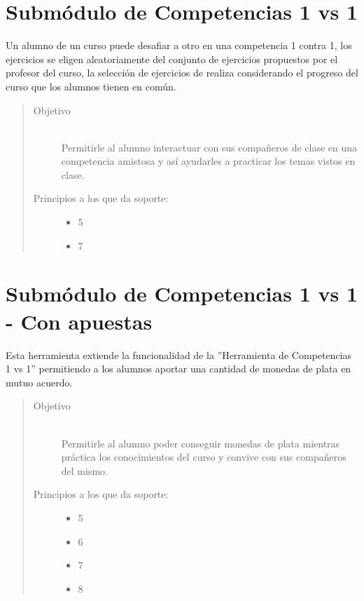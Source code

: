     
\section{Submódulo de Competencias 1 vs 1}

    Un alumno de un curso puede desafiar a otro en una competencia 1 contra 1, los ejercicios se eligen aleatoriamente del conjunto de ejercicios propuestos por el profesor del curso, la selección de ejercicios de realiza considerando el progreso del curso que los alumnos tienen en común.
    
    \begin{quote}
    \begin{description}
    \item[Objetivo] \hfill\\
        Permitirle al alumno interactuar con sus compañeros de clase en una competencia amistosa y así ayudarles a practicar los temas vistos en clase.
    
    \item[Principios a los que da soporte:] \hfill
        \begin{itemize}
            \item 5 \principioV
            \item 7 \principioVII 
        \end{itemize}
    \end{description}
    \end{quote}
 
\section{Submódulo de Competencias 1 vs 1 - Con apuestas}

    Esta herramienta extiende la funcionalidad de la ''Herramienta de Competencias 1 vs 1'' permitiendo a los alumnos aportar una cantidad de monedas de plata en mutuo acuerdo.
    
    \begin{quote}
    \begin{description}
    \item[Objetivo] \hfill\\
        Permitirle al alumno poder conseguir monedas de plata mientras práctica los conocimientos del curso y convive con sus compañeros del mismo.
    
    \item[Principios a los que da soporte:] \hfill
        \begin{itemize}
            \item 5 \principioV
            \item 6 \principioVI
            \item 7 \principioVII
            \item 8 \principioVIII
        \end{itemize}
    \end{description}
    \end{quote}
    
